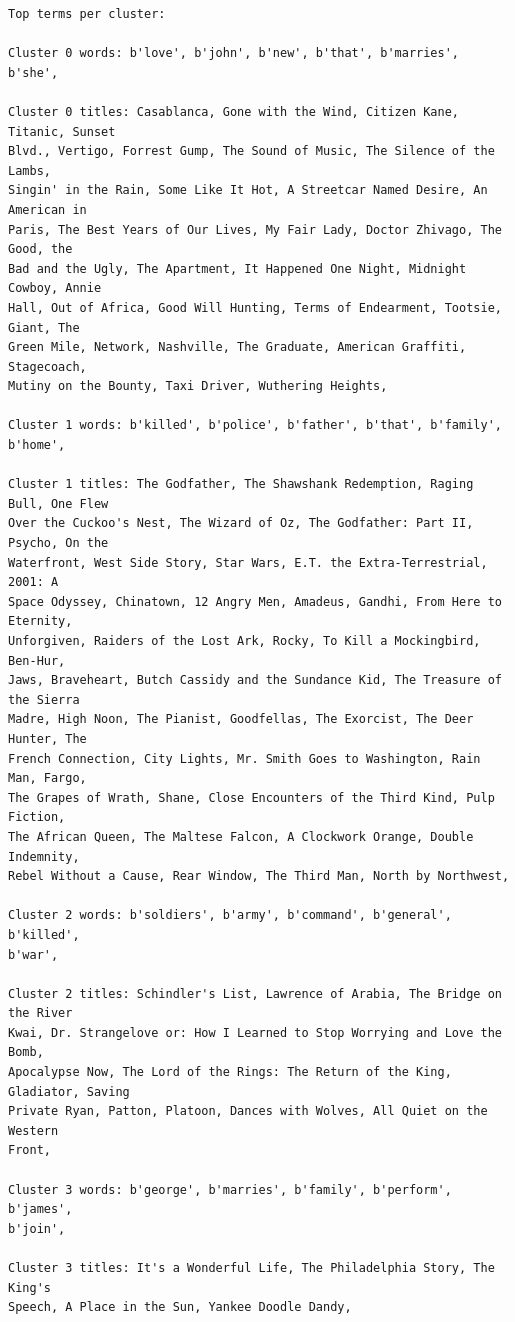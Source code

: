 \documentclass[11pt]{article}
\begin{document}
    \begin{Verbatim}[commandchars=\\\{\}]
Top terms per cluster:

Cluster 0 words: b'love', b'john', b'new', b'that', b'marries', b'she',

Cluster 0 titles: Casablanca, Gone with the Wind, Citizen Kane, Titanic, Sunset
Blvd., Vertigo, Forrest Gump, The Sound of Music, The Silence of the Lambs,
Singin' in the Rain, Some Like It Hot, A Streetcar Named Desire, An American in
Paris, The Best Years of Our Lives, My Fair Lady, Doctor Zhivago, The Good, the
Bad and the Ugly, The Apartment, It Happened One Night, Midnight Cowboy, Annie
Hall, Out of Africa, Good Will Hunting, Terms of Endearment, Tootsie, Giant, The
Green Mile, Network, Nashville, The Graduate, American Graffiti, Stagecoach,
Mutiny on the Bounty, Taxi Driver, Wuthering Heights,

Cluster 1 words: b'killed', b'police', b'father', b'that', b'family', b'home',

Cluster 1 titles: The Godfather, The Shawshank Redemption, Raging Bull, One Flew
Over the Cuckoo's Nest, The Wizard of Oz, The Godfather: Part II, Psycho, On the
Waterfront, West Side Story, Star Wars, E.T. the Extra-Terrestrial, 2001: A
Space Odyssey, Chinatown, 12 Angry Men, Amadeus, Gandhi, From Here to Eternity,
Unforgiven, Raiders of the Lost Ark, Rocky, To Kill a Mockingbird, Ben-Hur,
Jaws, Braveheart, Butch Cassidy and the Sundance Kid, The Treasure of the Sierra
Madre, High Noon, The Pianist, Goodfellas, The Exorcist, The Deer Hunter, The
French Connection, City Lights, Mr. Smith Goes to Washington, Rain Man, Fargo,
The Grapes of Wrath, Shane, Close Encounters of the Third Kind, Pulp Fiction,
The African Queen, The Maltese Falcon, A Clockwork Orange, Double Indemnity,
Rebel Without a Cause, Rear Window, The Third Man, North by Northwest,

Cluster 2 words: b'soldiers', b'army', b'command', b'general', b'killed',
b'war',

Cluster 2 titles: Schindler's List, Lawrence of Arabia, The Bridge on the River
Kwai, Dr. Strangelove or: How I Learned to Stop Worrying and Love the Bomb,
Apocalypse Now, The Lord of the Rings: The Return of the King, Gladiator, Saving
Private Ryan, Patton, Platoon, Dances with Wolves, All Quiet on the Western
Front,

Cluster 3 words: b'george', b'marries', b'family', b'perform', b'james',
b'join',

Cluster 3 titles: It's a Wonderful Life, The Philadelphia Story, The King's
Speech, A Place in the Sun, Yankee Doodle Dandy,

    \end{Verbatim}
\end{document}
